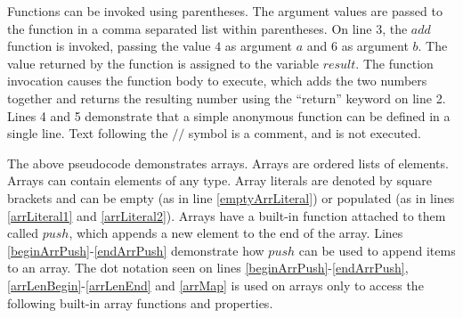 Functions can be invoked using parentheses. The argument values are passed to the function in a comma separated list within parentheses. On line 3, the $add$ function is invoked, passing the value $4$ as argument $a$ and $6$ as argument $b$. The value returned by the function is assigned to the variable $result$. The function invocation causes the function body to execute, which adds the two numbers together and returns the resulting number using the ``return'' keyword on line 2. Lines 4 and 5 demonstrate that a simple anonymous function can be defined in a single line. Text following the $//$ symbol is a comment, and is not executed.


The above pseudocode demonstrates arrays. Arrays are ordered lists of elements. Arrays can contain elements of any type. Array literals are denoted by square brackets and can be empty (as in line \ref{emptyArrLiteral}) or populated (as in lines \ref{arrLiteral1} and \ref{arrLiteral2}). Arrays have a built-in function attached to them called $push$, which appends a new element to the end of the array. Lines \ref{beginArrPush}-\ref{endArrPush} demonstrate how $push$ can be used to append items to an array. The dot notation seen on lines \ref{beginArrPush}-\ref{endArrPush}, \ref{arrLenBegin}-\ref{arrLenEnd} and \ref{arrMap} is used on arrays only to access the following built-in array functions and properties.

